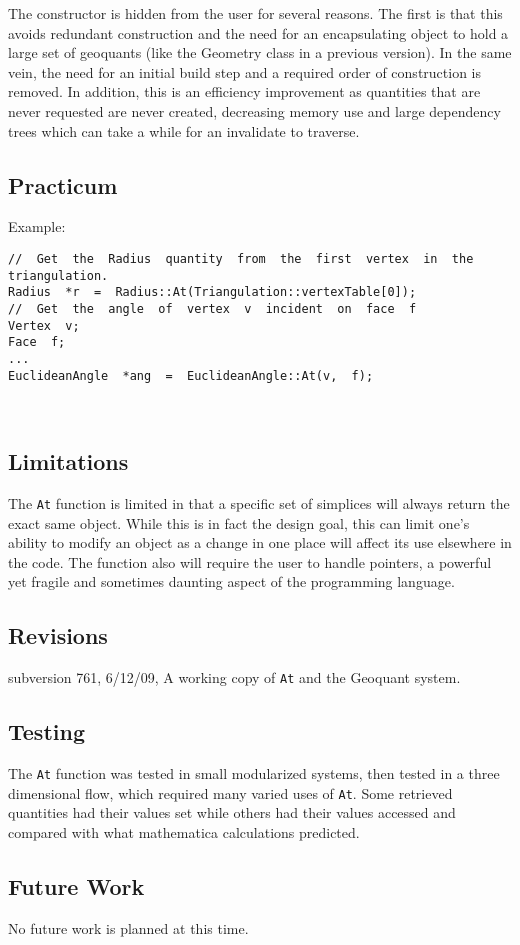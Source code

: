 \documentclass[12pt]{article}%
\begin{document}
The constructor is hidden from the user for several reasons. The first is that this avoids redundant construction and the need for an encapsulating object to hold a large set of geoquants (like the Geometry class in a previous version). In the same vein, the need for an initial build step and a required order of construction is removed. In addition, this is an efficiency improvement as quantities that are never requested are never created, decreasing memory use and large dependency trees which can take a while for an invalidate to traverse. \	

\subsection*{Practicum}

Example:
\begin{verbatim}
//  Get  the  Radius  quantity  from  the  first  vertex  in  the  triangulation.
Radius  *r  =  Radius::At(Triangulation::vertexTable[0]);
//  Get  the  angle  of  vertex  v  incident  on  face  f
Vertex  v;
Face  f;
...
EuclideanAngle  *ang  =  EuclideanAngle::At(v,  f);
\end{verbatim} \	

\subsection*{Limitations}

The \texttt{At} function is limited in that a specific set of simplices will always return the exact same object. While this is in fact the design goal, this can limit one's ability to modify an object as a change in one place will affect its use elsewhere in the code. The function also will require the user to handle pointers, a powerful yet fragile and sometimes daunting aspect of the programming language. \ 

\subsection*{Revisions}
subversion 761, 6/12/09, A working copy of \texttt{At} and the Geoquant system. \	

\subsection*{Testing}
The \texttt{At} function was tested in small modularized systems, then tested in a three dimensional flow, which required many varied uses of \texttt{At}. Some retrieved quantities had their values set while others had their values accessed and compared with what mathematica calculations predicted. \	

\subsection*{Future Work}

No future work is planned at this time. \	
\end{document}
